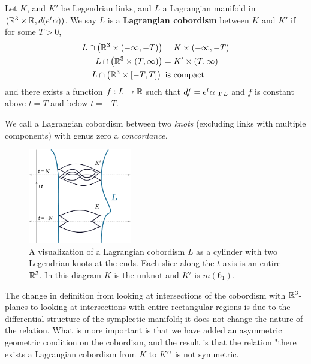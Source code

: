 \begin{defn}
    Let $K$, and $K'$ be Legendrian links, and $L$ a Lagrangian manifold in $(\mathbb{R}^3 \times \mathbb{R}, d(e^t \alpha))$. We say $L$ is a \textbf{Lagrangian cobordism} between $K$ and $K'$ if for some $T > 0$,
    \begin{align*}
        L \cap \left(\mathbb{R}^3 \times (-\infty, -T)\right) &= K \times (-\infty, -T)\\
        L \cap \left(\mathbb{R}^3 \times (T, \infty)\right) &= K' \times (T, \infty)\\
        L \cap \left(\mathbb{R}^3 \times [-T, T] \right)\, &\,\, \text{is compact}
    \end{align*}
    and there exists a function $f: L \to \mathbb{R}$ such that $df = e^t \alpha |_{\operatorname{T} L}$ and $f$ is constant above $t = T$ and below $t = -T$.

    We call a Lagrangian cobordism between two \emph{knots} (excluding links with multiple components) with genus zero a \emph{concordance.}
\end{defn}

\begin{figure}[ht]
    \centering
    \includegraphics[width=0.4\textwidth]{images/cobordism-visualization.pdf}
    \caption{A visualization of a Lagrangian cobordism $L$ as a cylinder with two Legendrian knots at the ends. Each slice along the $t$ axis is an entire $\mathbb{R}^3$. In this diagram $K$ is the unknot and $K'$ is $m(6_1)$.}%
    \label{fig:cobordism-vis}
\end{figure}

The change in definition from looking at intersections of the cobordism with $\mathbb{R}^3$-planes to looking at intersections with entire rectangular regions is due to the differential structure of the symplectic manifold; it does not change the nature of the relation. What is more important is that we have added an asymmetric geometric condition on the cobordism, and the result is that the relation "there exists a Lagrangian cobordism from $K$ to $K'$" is not symmetric.

